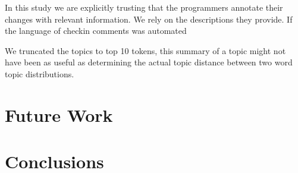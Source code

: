 \documentclass[times, 10pt,twocolumn]{article}
\begin{document}
In this study we are explicitly trusting that the programmers annotate
their changes with relevant information. We rely on the descriptions
they provide. If the language of checkin comments was automated

We truncated the topics to top 10 tokens, this summary of a topic
might not have been as useful as determining the actual topic distance
between two word topic distributions.

\section{ Future Work}
\section{Conclusions}




\end{document}
